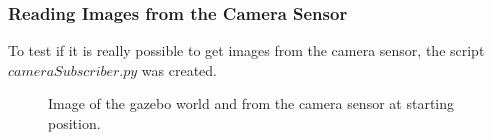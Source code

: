 \documentclass[12pt,oneside]{article}
\begin{document}
\subsubsection{Reading Images from the Camera Sensor}\label{experiment:reading-images}
To test if it is really possible to get images from the camera sensor, the script $cameraSubscriber.py$ was created. 
\begin{figure}[H]
  \centering
  \hfill
  \caption{Image of the gazebo world and from the camera sensor at starting position.}
\end{figure}
\end{document}
